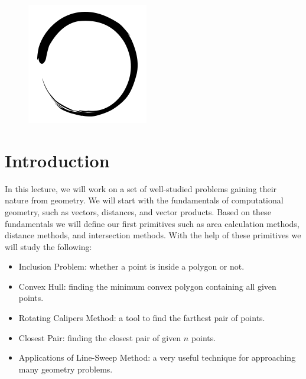 \documentclass[12pt]{article}
\title{\vspace{-2em}\mytitle\vspace{-0.3em}}
\author{\textbf{Editor}\\Yusuf Hakan Kalaycı\\ \ \\ \textbf{Reviewer} \\Hasan Bal}
\date{}
\begin{document}
\begin{figure}
  \centering
  \includegraphics[width=\linewidth/4]{inzva-logo.png}
  \label{fig:inzva}
\end{figure}
\maketitle

\cleardoublepage
\tableofcontents
{}
\cleardoublepage

\newcommand{\R}{\mathbb{R}}

\section{Introduction}
In this lecture, we will work on a set of well-studied problems gaining their nature from geometry. We will start with the fundamentals of computational geometry, such as vectors, distances, and vector products. Based on these fundamentals we will define
our first primitives such as area calculation methods, distance methods, and intersection methods. With the help of these primitives we will study the following:
\begin{itemize}
    \item Inclusion Problem: whether a point is inside a polygon or not.
    \item Convex Hull: finding the minimum convex polygon containing all given points.
    \item Rotating Calipers Method: a tool to find the farthest pair of points.
    \item Closest Pair: finding the closest pair of given $n$ points.
    \item Applications of Line-Sweep Method: a very useful technique for approaching
    many geometry problems.
\end{itemize}
\end{document}

